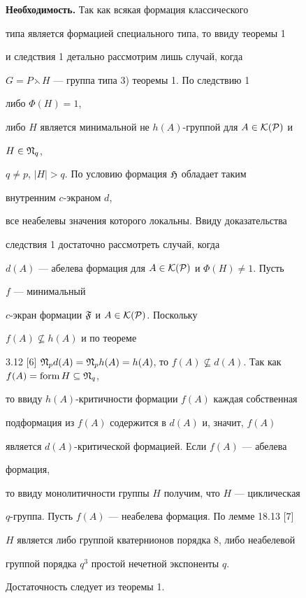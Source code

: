 \begin{pf} 


{\bf Необходимость.} Так как всякая формация классического 


типа является формацией специального типа, то ввиду теоремы 1 


и следствия 1 детально рассмотрим лишь случай, когда 


$G=P\leftthreetimes H$ --- группа типа 3) теоремы 1. По следствию 1 


либо $\Phi(H)=1$, 


либо $H$ является минимальной не $h(A)$-группой для $A\in\cal K(P)$ и 


$H\in\frak N_q$, 


$q\ne p$, $|H|>q$. По условию формация $\frak H$ обладает таким 


внутренним $c$-экраном $d$, 


все неабелевы значения которого локальны. Ввиду доказательства 


следствия 1 достаточно рассмотреть случай, когда 


$d(A)$ --- абелева формация для $A\in\cal K(P)$ и $\Phi(H)\ne1$. Пусть 


$f$ --- минимальный 


$c$-экран формации $\frak F$ и $A\in\cal K(P)$. Поскольку 


$f(A)\nsubseteq h(A)$ и по теореме 


3.12 [6] $\frak N_p d(A)=\frak N_p h(A)=h(A)$, то $f(A)\nsubseteq


d(A)$. Так как $f(A)=\form H\subseteq\frak N_q$, 


то ввиду $h(A)$-критичности формации $f(A)$ каждая собственная 


подформация из $f(A)$ содержится в $d(A)$ и, значит, $f(A)$ 


является $d(A)$-критической формацией. Если $f(A)$ --- абелева 


формация, 


то ввиду монолитичности группы $H$ получим, что $H$ --- циклическая 


$q$-группа. Пусть $f(A)$ --- неабелева формация. По лемме 18.13 [7] 


$H$ является либо группой кватернионов порядка $8$, либо неабелевой 


группой порядка $q^3$ простой нечетной экспоненты $q$. 


\smallskip 


 


Достаточность следует из теоремы 1. 


\end{pf} 


